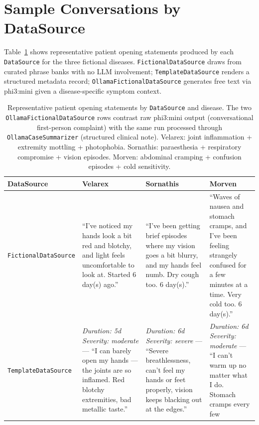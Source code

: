 \documentclass[utf8]{frontiers_suppmat} %
\begin{document}
\section{Sample Conversations by DataSource}
\label{sec:supp-sample-convs}

Table~\ref{tab:sample-convs} shows representative patient opening
statements produced by each \texttt{DataSource} for the three fictional
diseases. \texttt{FictionalDataSource} draws from curated phrase banks
with no LLM involvement; \texttt{TemplateDataSource} renders a
structured metadata record; \texttt{OllamaFictionalDataSource} generates
free text via phi3:mini given a disease-specific symptom context.

\begin{table}[H]
  \centering
  \caption{Representative patient opening statements by \texttt{DataSource}
  and disease. The two \texttt{OllamaFictionalDataSource} rows contrast
  raw phi3:mini output (conversational first-person complaint) with the
  same run processed through \texttt{OllamaCaseSummarizer} (structured
  clinical note). Velarex: joint inflammation + extremity mottling +
  photophobia. Sornathis: paraesthesia + respiratory compromise + vision
  episodes. Morven: abdominal cramping + confusion episodes + cold
  sensitivity.}
  \label{tab:sample-convs}
  \begin{tabular}{p{3.4cm}p{3.5cm}p{3.5cm}p{3.5cm}}
    \toprule
    DataSource & Velarex & Sornathis & Morven \\
    \midrule
    \texttt{Fictional\-DataSource}
      & ``I've noticed my hands look a bit red and blotchy, and light feels
        uncomfortable to look at. Started 6 day(s) ago.''
      & ``I've been getting brief episodes where my vision goes a bit
        blurry, and my hands feel numb. Dry cough too. 6 day(s).''
      & ``Waves of nausea and stomach cramps, and I've been feeling
        strangely confused for a few minutes at a time. Very cold too.
        6 day(s).'' \\[4pt]
    \texttt{Template\-DataSource}
      & \textit{Duration: 5d \textbar{} Severity: moderate} ---
        ``I can barely open my hands --- the joints are so inflamed.
        Red blotchy extremities, bad metallic taste.''
      & \textit{Duration: 6d \textbar{} Severity: severe} ---
        ``Severe breathlessness, can't feel my hands or feet properly,
        vision keeps blacking out at the edges.''
      & \textit{Duration: 6d \textbar{} Severity: moderate} ---
        ``I can't warm up no matter what I do. Stomach cramps every few

\end{tabular}
\end{table}
\end{document}
